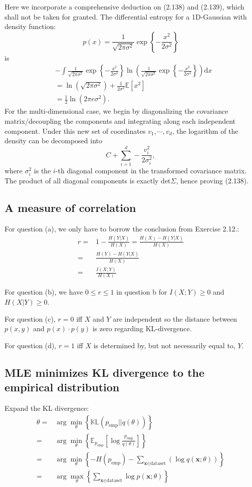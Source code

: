 \documentclass[UTF8]{ctexart}
\begin{document}
Here we incorporate a comprehensive deduction on (2.138) and (2.139), which shall not be taken for granted. 
The differential entropy for a 1D-Gaussian with density function: 
$$p(x)=\frac{1}{\sqrt{2\pi\sigma^{2}}}\exp\left\{-\frac{x^{2}}{2\sigma^{2}} \right\}$$ 
is
$$
\begin{aligned}
&-\int\frac{1}{\sqrt{2\pi\sigma^{2}}}\exp\left\{-\frac{x^{2}}{2\sigma^{2}} \right\} \ln\left(\frac{1}{\sqrt{2\pi\sigma^{2}}}\exp\left\{-\frac{x^{2}}{2\sigma^{2}} \right\} \right) \text{d}{x}\\
&=\ln(\sqrt{2\pi\sigma^{2}})+\frac{1}{2\sigma^{2}}\mathbb{E}[x^{2}]\\
&=\frac{1}{2}\ln(2\pi e\sigma^{2}).
\end{aligned}
$$
For the multi-dimensional case, we begin by diagonalizing the covariance matrix/decoupling the components and integrating along each independent component. 
Under this new set of coordinates $v_{1},\cdots,v_{d}$, the logarithm of the density can be decomposed into 
$$C+\sum_{i=1}^{d}-\frac{v_{i}^{2}}{2\sigma_{i}^{2}},$$
where $\sigma^{2}_{i}$ is the $i$-th diagonal component in the transformed covariance matrix. 
The product of all diagonal components is exactly $\text{det}\Sigma$, hence proving (2.138). 

\subsection{A measure of correlation}
For question (a), we only have to borrow the conclusion from Exercise 2.12.:
\begin{align}
r=&1-\frac{H(Y|X)}{H(X)}=\frac{H(X)-H(Y|X)}{H(X)} \nonumber \\
=&\frac{H(Y)-H(Y|X)}{H(X)} \nonumber \\
=&\frac{I(X;Y)}{H(X)} \nonumber 
\end{align}

For question (b), we have $0 \leq r \leq 1$ in question b for $I(X;Y) \geq 0$ and $H(X|Y) \geq 0$.

For question (c), $r=0$ iff $X$ and $Y$ are independent so the distance between $p(x,y)$ and $p(x)\cdot p(y)$ is zero regarding KL-divergence.

For question (d), $r=1$ iff $X$ is determined by, but not necessarily equal to, $Y$.

\subsection{MLE minimizes KL divergence to the empirical distribution}
Expand the KL divergence:
\begin{align}
\theta=&\arg\min_{\theta}\left\{ \mathbb{KL}(p_{\text{emp}}||q(\theta)) \right\} \nonumber \\
=&\arg\min_{\theta}\left\{ \mathbb{E}_{p_{\text{emp}}}[\log \frac{p_{\text{emp}}}{q(\theta)}] \right\} \nonumber \\
=&\arg\min_{\theta}\left\{ -H(p_{\text{emp}}) - \sum_{\textbf{x}\in \text{dataset}}(\log q(\textbf{x};\theta)) \right\} \nonumber \\
=&\arg\max_{\theta}\left\{ \sum_{\textbf{x}\in \text{dataset}} \log p(\textbf{x};\theta)\right\} \nonumber
\end{align}
 
\end{document}
